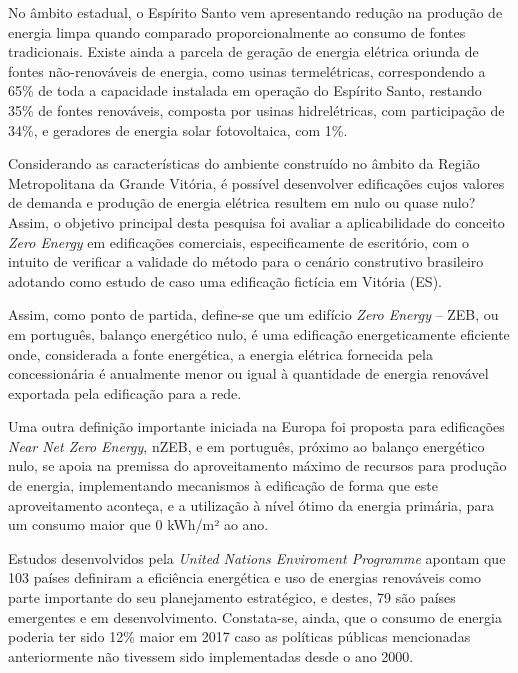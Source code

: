 \begin{onehalfspace}
    \noindent No âmbito estadual, o Espírito Santo vem apresentando redução na produção 
    de energia limpa quando comparado proporcionalmente ao consumo de fontes tradicionais. 
    Existe ainda a parcela de geração de energia elétrica oriunda de fontes não-renováveis 
    de energia, como usinas termelétricas, correspondendo a 65\% de toda a capacidade 
    instalada em operação do Espírito Santo, restando 35\% de fontes renováveis, composta 
    por usinas hidrelétricas, com participação de 34\%, e geradores de energia solar 
    fotovoltaica, com 1\%.\vspace*{0.3cm}

    \noindent Considerando as características do ambiente construído no âmbito da 
    Região Metropolitana da Grande Vitória, é possível desenvolver edificações cujos 
    valores de demanda e produção de energia elétrica resultem em nulo ou quase nulo? 
    Assim, o objetivo principal desta pesquisa foi avaliar a aplicabilidade do conceito 
    \textit{Zero Energy} em edificações comerciais, especificamente de escritório, com 
    o intuito de verificar a validade do método para o cenário construtivo brasileiro 
    adotando como estudo de caso uma edificação fictícia em Vitória (ES).\vspace*{0.3cm}

    \noindent Assim, como ponto de partida, define-se que um edifício 
    \textit{Zero Energy} – ZEB, ou em português, balanço energético nulo, é uma 
    edificação energeticamente eficiente onde, considerada a fonte energética, a 
    energia elétrica fornecida pela concessionária é anualmente menor ou igual à 
    quantidade de energia renovável exportada pela edificação para a rede.\vspace*{0.3cm}

    \noindent Uma outra definição importante iniciada na Europa foi proposta para 
    edificações \textit{Near Net Zero Energy}, nZEB, e em português, próximo ao 
    balanço energético nulo, se apoia na premissa do aproveitamento máximo 
    de recursos para produção de energia, implementando mecanismos à edificação de 
    forma que este aproveitamento aconteça, e a utilização à nível ótimo da energia 
    primária, para um consumo maior que 0 kWh/m² ao ano.\vspace*{0.3cm}

    \noindent Estudos desenvolvidos pela \textit{United Nations Enviroment Programme}
    apontam que 103 países definiram a eficiência energética e uso de energias 
    renováveis como parte importante do seu planejamento estratégico, e destes, 
    79 são países emergentes e em desenvolvimento. Constata-se, ainda, que o 
    consumo de energia poderia ter sido 12\% maior em 2017 caso as políticas 
    públicas mencionadas anteriormente não tivessem sido implementadas desde o ano 2000.\vspace*{0.3cm}


\end{onehalfspace}
